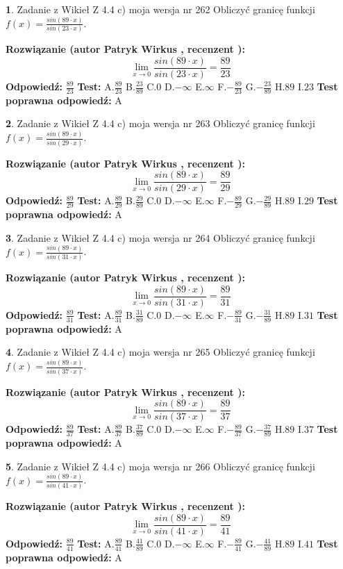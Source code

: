 \documentclass[12pt, a4paper]{article}
\theoremstyle{definition} %
\newtheorem{zad}{}
\newcommand{\zadStart}[1]{\begin{zad}#1\newline}
\newcommand{\zadStop}{\end{zad}}
\newcommand{\rozwStart}[2]{\noindent \textbf{Rozwiązanie (autor #1 , recenzent #2): }\newline}
\newcommand{\rozwStop}{\newline}
\newcommand{\odpStart}{\noindent \textbf{Odpowiedź:}\newline}
\newcommand{\odpStop}{\newline}
\newcommand{\testStart}{\noindent \textbf{Test:}\newline}
\newcommand{\testStop}{\newline}
\newcommand{\kluczStart}{\noindent \textbf{Test poprawna odpowiedź:}\newline}
\newcommand{\kluczStop}{\newline}
\begin{document}
\zadStart{Zadanie z Wikieł Z 4.4 c) moja wersja nr 262}
Obliczyć granicę funkcji $f(x)=\frac{sin(89\cdot x)}{sin(23\cdot x)}$.
\zadStop
\rozwStart{Patryk Wirkus}{}
$$\lim\limits_{x\to 0}\frac{sin(89\cdot x)}{sin(23\cdot x)}=
\frac{89}{23}$$
\rozwStop
\odpStart
$\frac{89}{23}$
\odpStop
\testStart
A.$\frac{89}{23}$
B.$\frac{23}{89}$
C.$0$
D.$-\infty$
E.$\infty$
F.$-\frac{89}{23}$
G.$-\frac{23}{89}$
H.$89$
I.$23$
\testStop
\kluczStart
A
\kluczStop



\zadStart{Zadanie z Wikieł Z 4.4 c) moja wersja nr 263}
Obliczyć granicę funkcji $f(x)=\frac{sin(89\cdot x)}{sin(29\cdot x)}$.
\zadStop
\rozwStart{Patryk Wirkus}{}
$$\lim\limits_{x\to 0}\frac{sin(89\cdot x)}{sin(29\cdot x)}=
\frac{89}{29}$$
\rozwStop
\odpStart
$\frac{89}{29}$
\odpStop
\testStart
A.$\frac{89}{29}$
B.$\frac{29}{89}$
C.$0$
D.$-\infty$
E.$\infty$
F.$-\frac{89}{29}$
G.$-\frac{29}{89}$
H.$89$
I.$29$
\testStop
\kluczStart
A
\kluczStop



\zadStart{Zadanie z Wikieł Z 4.4 c) moja wersja nr 264}
Obliczyć granicę funkcji $f(x)=\frac{sin(89\cdot x)}{sin(31\cdot x)}$.
\zadStop
\rozwStart{Patryk Wirkus}{}
$$\lim\limits_{x\to 0}\frac{sin(89\cdot x)}{sin(31\cdot x)}=
\frac{89}{31}$$
\rozwStop
\odpStart
$\frac{89}{31}$
\odpStop
\testStart
A.$\frac{89}{31}$
B.$\frac{31}{89}$
C.$0$
D.$-\infty$
E.$\infty$
F.$-\frac{89}{31}$
G.$-\frac{31}{89}$
H.$89$
I.$31$
\testStop
\kluczStart
A
\kluczStop



\zadStart{Zadanie z Wikieł Z 4.4 c) moja wersja nr 265}
Obliczyć granicę funkcji $f(x)=\frac{sin(89\cdot x)}{sin(37\cdot x)}$.
\zadStop
\rozwStart{Patryk Wirkus}{}
$$\lim\limits_{x\to 0}\frac{sin(89\cdot x)}{sin(37\cdot x)}=
\frac{89}{37}$$
\rozwStop
\odpStart
$\frac{89}{37}$
\odpStop
\testStart
A.$\frac{89}{37}$
B.$\frac{37}{89}$
C.$0$
D.$-\infty$
E.$\infty$
F.$-\frac{89}{37}$
G.$-\frac{37}{89}$
H.$89$
I.$37$
\testStop
\kluczStart
A
\kluczStop



\zadStart{Zadanie z Wikieł Z 4.4 c) moja wersja nr 266}
Obliczyć granicę funkcji $f(x)=\frac{sin(89\cdot x)}{sin(41\cdot x)}$.
\zadStop
\rozwStart{Patryk Wirkus}{}
$$\lim\limits_{x\to 0}\frac{sin(89\cdot x)}{sin(41\cdot x)}=
\frac{89}{41}$$
\rozwStop
\odpStart
$\frac{89}{41}$
\odpStop
\testStart
A.$\frac{89}{41}$
B.$\frac{41}{89}$
C.$0$
D.$-\infty$
E.$\infty$
F.$-\frac{89}{41}$
G.$-\frac{41}{89}$
H.$89$
I.$41$
\testStop
\kluczStart
A
\kluczStop
\end{document}
